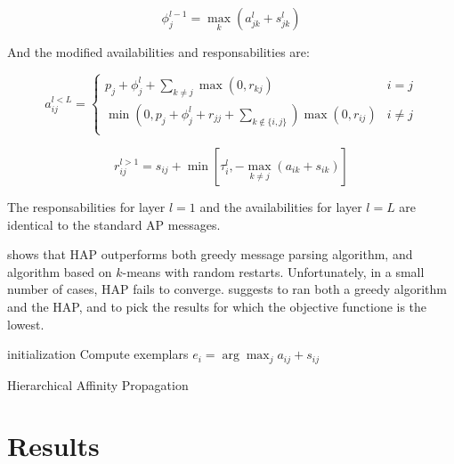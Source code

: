 \documentclass{ipol}
\begin{document}
\begin{equation}
\phi_j^{l - 1} = \max_k (a_{jk}^l + s_{jk}^l)
\end{equation}

And the modified availabilities and responsabilities are:

\begin{equation}
a_{ij}^{l < L} = \begin{cases}
	    p_j + \phi_j^l + \sum_{k \neq j} \max(0, r_{kj}) &  i = j \\
	    \min ( 0, p_j + \phi_j^l + r_{jj} + \sum_{k \notin \{i, j\} } ) \max (0, r_{ij}) & i \neq j\\
	 \end{cases}
\end{equation}

\begin{equation*}
r_{ij}^{l > 1} = s_{ij}  + \min [ \tau_i^l, - \max_{k \neq j} (a_{ik} + s_{ik}) ]
\end{equation*}

The responsabilities for layer $l = 1$ and the availabilities for layer $l =
L$ are identical to the standard AP messages.

\cite{hap} shows that HAP outperforms both greedy message parsing algorithm,
and algorithm based on $k$-means with random restarts. Unfortunately, in a
small number of cases, HAP fails to converge. \cite{hap} suggests to ran both
a greedy algorithm and the HAP, and to pick the results for which the
objective functione is the lowest.

\begin{algorithm}[h]
  \SetLine
  initialization\;
  Compute exemplars $e_i = \arg \max_{j} a_{ij} + s_{ij}$ \;
  \caption{Hierarchical Affinity Propagation}
\end{algorithm}

\section{Results}



\end{document}
